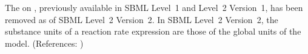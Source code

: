 The   on \KineticLaw, previously
available in SBML Level~1 and Level~2 Version~1, has been removed as of
SBML Level~2 Version~2.  In SBML Level~2 Version~2, the substance units of
a reaction rate expression are those of the global  units of
the model.  (References: )
